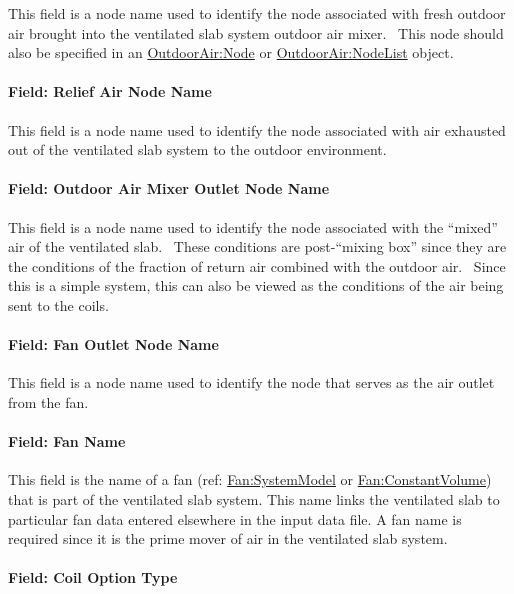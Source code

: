 This field is a node name used to identify the node associated with fresh outdoor air brought into the ventilated slab system outdoor air mixer.~ This node should also be specified in an \hyperref[outdoorairnode]{OutdoorAir:Node} or \hyperref[outdoorairnodelist]{OutdoorAir:NodeList} object.

\paragraph{Field: Relief Air Node Name}\label{field-relief-air-node-name}

This field is a node name used to identify the node associated with air exhausted out of the ventilated slab system to the outdoor environment.

\paragraph{Field: Outdoor Air Mixer Outlet Node Name}\label{field-outdoor-air-mixer-outlet-node-name}

This field is a node name used to identify the node associated with the ``mixed'' air of the ventilated slab.~ These conditions are post-``mixing box'' since they are the conditions of the fraction of return air combined with the outdoor air.~ Since this is a simple system, this can also be viewed as the conditions of the air being sent to the coils.

\paragraph{Field: Fan Outlet Node Name}\label{field-fan-outlet-node-name}

This field is a node name used to identify the node that serves as the air outlet from the fan.

\paragraph{Field: Fan Name}\label{field-fan-name-003}

This field is the name of a fan (ref: \hyperref[fansystemmodel]{Fan:SystemModel} or \hyperref[fanconstantvolume]{Fan:ConstantVolume}) that is part of the ventilated slab system.  This name links the ventilated slab to particular fan data entered elsewhere in the input data file.  A fan name is required since it is the prime mover of air in the ventilated slab system.

\paragraph{Field: Coil Option Type}\label{field-coil-option-type}

